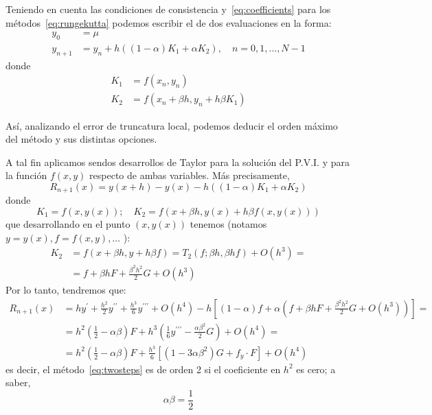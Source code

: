 Teniendo en cuenta las condiciones de consistencia y~\eqref{eq:coefficients}
para los métodos~\eqref{eq:rungekutta} podemos escribir el de dos evaluaciones en la forma:
\begin{equation}\label{eq:twosteps}
    \begin{aligned}
        y_0     & =\mu                                                                   \\
        y_{n+1} & =y_n+h\left((1-\alpha) K_1+\alpha K_2\right), \quad n=0,1, \ldots, N-1
    \end{aligned}
\end{equation}
donde
\begin{align*}
    K_1 & =f\left(x_n, y_n\right)                     \\
    K_2 & =f\left(x_n+\beta h, y_n+h \beta K_1\right)
\end{align*}

Así, analizando el error de truncatura local, podemos deducir el
orden máximo del método y sus distintas opciones.

A tal fin aplicamos sendos desarrollos de Taylor para la solución del
P.V.I. y para la función $f\left(x,y\right)$ respecto de ambas
variables.
Más precisamente,
\begin{equation*}
    R_{n+1}\left(x\right)=
    y\left(x+h\right)-y\left(x\right)-h\left((1-\alpha) K_1+\alpha K_2\right)
\end{equation*}
donde
\begin{equation*}
    K_{1}=f(x, y(x));\quad K_2=f(x+\beta h, y(x)+h \beta f(x, y(x)))
\end{equation*}
que desarrollando en el punto $(x, y(x))$ tenemos (notamos $y=y(x), f=f(x, y), \ldots$ ):
\begin{align*}
    K_2 & =f(x+\beta h, y+h \beta f)=T_2(f ; \beta h, \beta h f)+O\left(h^3\right)= \\
        & =f+\beta h F+\frac{\beta^2 h^2}{2} G+O\left(h^3\right)
\end{align*}
Por lo tanto, tendremos que:
\begin{align*}
    R_{n+1}(x) & =h y^{\prime}+\frac{h^2}{2} y^{\prime \prime}+\frac{h^3}{6} y^{\prime \prime \prime}+O\left(h^4\right)-h\left[(1-\alpha) f+\alpha\left(f+\beta h F+\frac{\beta^2 h^2}{2} G+O\left(h^3\right)\right)\right]= \\
               & =h^2\left(\frac{1}{2}-\alpha \beta\right) F+h^3\left(\frac{1}{6} y^{\prime \prime \prime}-\frac{\alpha \beta^2}{2} G\right)+O\left(h^4\right)=                                                              \\
               & =h^2\left(\frac{1}{2}-\alpha \beta\right) F+\frac{h^3}{6}\left[\left(1-3 \alpha \beta^2\right) G+f_y \cdot F\right]+O\left(h^4\right)
\end{align*}
es decir, el método~\eqref{eq:twosteps} es de orden 2 si el coeficiente en $h^2$ es cero; a saber,
\begin{equation*}
    \alpha \beta=\frac{1}{2}
\end{equation*}

